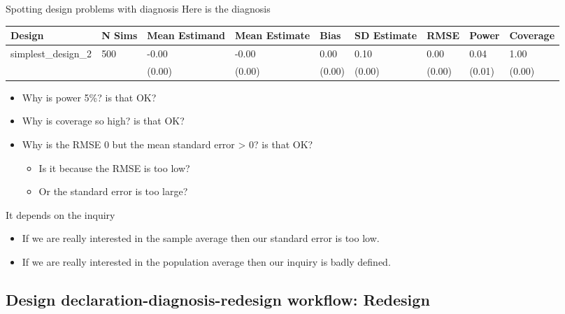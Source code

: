 \documentclass[
  11pt,
  ignorenonframetext,
]{beamer}
\providecommand{\tightlist}{%
  \setlength{\itemsep}{0pt}\setlength{\parskip}{0pt}}\usepackage{longtable,booktabs,array}
\begin{document}
\begin{frame}{Spotting design problems with diagnosis}
\protect\hypertarget{spotting-design-problems-with-diagnosis-1}{}
Here is the diagnosis

\begin{tabular}{l|l|l|l|l|l|l|l|l}
\hline
Design & N Sims & Mean Estimand & Mean Estimate & Bias & SD Estimate & RMSE & Power & Coverage\\
\hline
simplest\_design\_2 & 500 & -0.00 & -0.00 & 0.00 & 0.10 & 0.00 & 0.04 & 1.00\\
\hline
 &  & (0.00) & (0.00) & (0.00) & (0.00) & (0.00) & (0.01) & (0.00)\\
\hline
\end{tabular}

\begin{itemize}
\tightlist
\item
  Why is power 5\%? is that OK?
\item
  Why is coverage so high? is that OK?
\item
  Why is the RMSE 0 but the mean standard error \textgreater{} 0? is
  that OK?

  \begin{itemize}
  \tightlist
  \item
    Is it because the RMSE is too low?
  \item
    Or the standard error is too large?
  \end{itemize}
\end{itemize}
\end{frame}

\begin{frame}{It depends on the inquiry}
\protect\hypertarget{it-depends-on-the-inquiry}{}
\begin{itemize}
\tightlist
\item
  If we are really interested in the sample average then our standard
  error is too low.
\item
  If we are really interested in the population average then our inquiry
  is badly defined.
\end{itemize}
\end{frame}

\hypertarget{design-declaration-diagnosis-redesign-workflow-redesign}{%
\subsection{Design declaration-diagnosis-redesign workflow:
Redesign}\label{design-declaration-diagnosis-redesign-workflow-redesign}}
\end{document}
